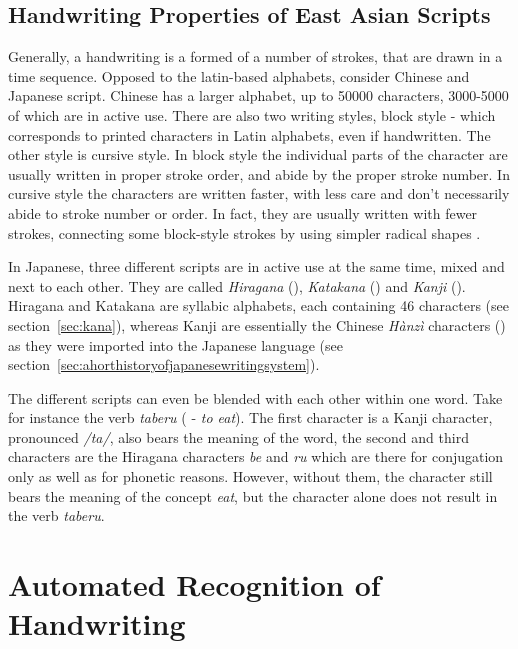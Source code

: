 \subsection{Handwriting Properties of East Asian Scripts}
\label{sec:handwritingpropertieseastasian}

Generally, a handwriting is a formed of a number of strokes, that are drawn
in a time sequence. Opposed to the latin-based alphabets, consider Chinese and
Japanese script. Chinese has a larger alphabet, up to 50000 characters, 
3000-5000 of which are in active use. There are also two writing styles,
block style - which corresponds to printed characters in Latin alphabets,
even if handwritten. The other style is cursive style. In block style the
individual parts of the character are usually written in proper stroke order,
and abide by the proper stroke number. In cursive style the characters are
written faster, with less care and don't necessarily abide to stroke
number or order. In fact, they are usually written with fewer strokes,
connecting some block-style strokes by using simpler radical 
shapes .

In Japanese, three different scripts are in active use at the same time,
mixed and next to each other. They are called \emph{Hiragana} (), 
\emph{Katakana} () and \emph{Kanji} ().
Hiragana and Katakana are syllabic alphabets, each containing 46 characters
(see section~\ref{sec:kana}), whereas Kanji are essentially the Chinese 
\emph{Hànzì} characters () as they were imported into the Japanese 
language (see section~\ref{sec:ahorthistoryofjapanesewritingsystem}).

The different scripts can even be blended with each other within one word. 
Take for instance the verb \emph{taberu}  ( - \emph{to eat}). 
The first character is a Kanji character, pronounced \emph{/ta/}, 
also bears the meaning of the word, the second and third characters 
are the Hiragana characters \emph{be} and \emph{ru} which are there for 
conjugation only as well as for phonetic reasons. 
However, without them, the character  still bears the meaning of 
the concept \emph{eat}, but the character alone does not result in 
the verb \emph{taberu}.

\section{Automated Recognition of Handwriting}
\label{sec:autorecoofhandwriting}

